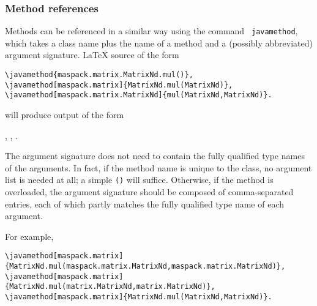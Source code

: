 \documentclass{article}
\begin{document}
\subsubsection{Method references}

Methods can be referenced in a similar way using the command {\tt
\BKS javamethod}, which takes a class name plus the name of a method and
a (possibly abbreviated) argument signature.
LaTeX source of the form

\begin{lstlisting}[]
\javamethod{maspack.matrix.MatrixNd.mul()}, 
\javamethod[maspack.matrix]{MatrixNd.mul(MatrixNd)},
\javamethod[maspack.matrix.MatrixNd]{mul(MatrixNd,MatrixNd)}.
\end{lstlisting}

will produce output of the form

\setjavabase{}
, 
,
.

%
%
%

The argument signature does not need to contain the fully qualified
type names of the arguments. In fact, if the method name is unique to
the class, no argument list is needed at all; a simple {\tt ()} will
suffice.  Otherwise, if the method is overloaded, the argument
signature should be composed of comma-separated entries, each of which
partly matches the fully qualified type name of each argument.

For example,

\begin{lstlisting}[]
\javamethod[maspack.matrix]{MatrixNd.mul(maspack.matrix.MatrixNd,maspack.matrix.MatrixNd)}, 
\javamethod[maspack.matrix]{MatrixNd.mul(matrix.MatrixNd,matrix.MatrixNd)},
\javamethod[maspack.matrix]{MatrixNd.mul(MatrixNd,MatrixNd)}.
\end{lstlisting}
\end{document}
